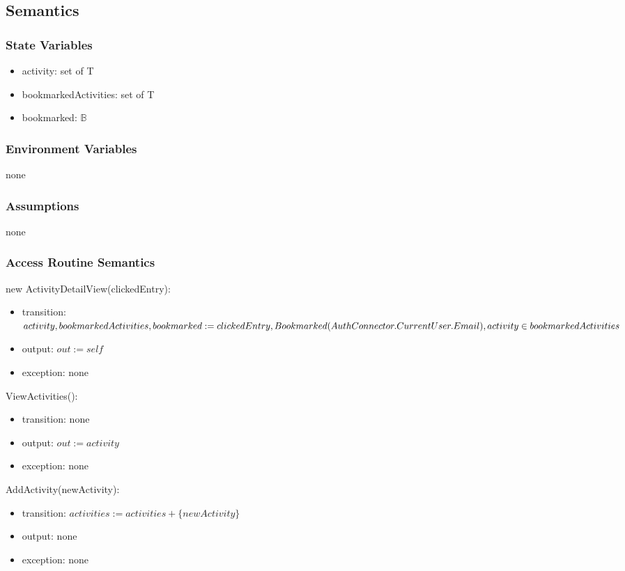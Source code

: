 \documentclass[12pt, titlepage]{article}
\begin{document}
\subsection{Semantics}

\subsubsection{State Variables}

\begin{itemize}
  \item activity: set of T
  \item bookmarkedActivities: set of T
  \item bookmarked: $\mathbb{B}$
\end{itemize}

\subsubsection{Environment Variables}

none

\subsubsection{Assumptions}

none

\subsubsection{Access Routine Semantics}

\noindent new ActivityDetailView(clickedEntry):
\begin{itemize}
\item transition: $activity, bookmarkedActivities, bookmarked:= clickedEntry,\\ Bookmarked(AuthConnector.CurrentUser.Email), activity \in bookmarkedActivities$
\item output: $out := self$
\item exception: none
\end{itemize}

\noindent ViewActivities():
\begin{itemize}
\item transition: none
\item output: $out := activity$
\item exception: none
\end{itemize}

\noindent AddActivity(newActivity):
\begin{itemize}
\item transition: $activities := activities + \{newActivity\}$
\item output: none
\item exception: none
\end{itemize}
\end{document}
